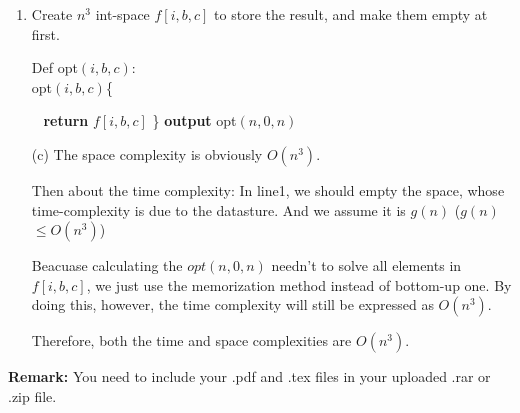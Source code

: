 \documentclass[12pt,a4paper]{article}
\makeatletter
\newtheorem*{solution}{Solution}
\theoremstyle{definition}
\renewenvironment{solution}[1][Solution] {\par\pushQED{\qed}\normalfont\topsep6\p@\@plus6\p@\relax\trivlist\item[\hskip\labelsep\bfseries#1\@addpunct{.}]\ignorespaces}{\popQED\endtrivlist\@endpefalse} \makeatother
\makeatother
\begin{document}
\begin{enumerate}
\begin{solution}
\begin{minipage}{0.9\textwidth}
\begin{algorithm}[H]
  			\BlankLine
  			
  			Create $n^3$ int-space $f[i,b,c]$ to store the result, and make them empty at first.
  			
  			\BlankLine
  			
  			Def opt$(i,b,c)$:
  			~\\
  			opt$(i,b,c)$\{
  			
  				\
  				\textbf{return} $f[i,b,c]$\;
  		   	\}
  			\BlankLine
  			\textbf{output} opt$(n,0,n)$\;
  		\end{algorithm}
  		
  	\end{minipage}
  	
  	(c) The space complexity is obviously $O(n^3)$.
  	
  	Then about the time complexity: 
  	In line1, we should empty the space, whose time-complexity is due to the datasture. And we assume it is $g(n)$ ($g(n)$$\leq$$O(n^3)$)
  	
  	Beacuase calculating the $opt(n,0,n)$ needn't to solve all elements in $f[i,b,c]$, we just use the memorization method instead of bottom-up one. By doing this, however, the time complexity will still be expressed as $O(n^3)$. 
  	
  	Therefore, both the time and space complexities are $O(n^3)$.
  	
  	
  \end{solution}











\end{enumerate}

\vspace{20pt}

\textbf{Remark:} You need to include your .pdf and .tex files in your uploaded .rar or .zip file.

\end{document}
